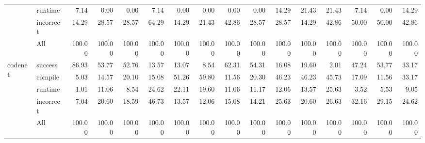 \begin{tabular}{llrrrrrrrrrrrrrr}
 & runtime & 7.14 & 0.00 & 0.00 & 7.14 & 0.00 & 0.00 & 0.00 & 0.00 & 14.29 & 21.43 & 21.43 & 7.14 & 0.00 & 14.29 \\
 & incorrect & 14.29 & 28.57 & 28.57 & 64.29 & 14.29 & 21.43 & 42.86 & 28.57 & 28.57 & 14.29 & 42.86 & 50.00 & 50.00 & 42.86 \\
 & All & 100.00 & 100.00 & 100.00 & 100.00 & 100.00 & 100.00 & 100.00 & 100.00 & 100.00 & 100.00 & 100.00 & 100.00 & 100.00 & 100.00 \\
\cline{1-16}
\multirow[t]{5}{*}{codenet} & success & 86.93 & 53.77 & 52.76 & 13.57 & 13.07 & 8.54 & 62.31 & 54.31 & 16.08 & 19.60 & 2.01 & 47.24 & 53.77 & 33.17 \\
 & compile & 5.03 & 14.57 & 20.10 & 15.08 & 51.26 & 59.80 & 11.56 & 20.30 & 46.23 & 46.23 & 45.73 & 17.09 & 11.56 & 33.17 \\
 & runtime & 1.01 & 11.06 & 8.54 & 24.62 & 22.11 & 19.60 & 11.06 & 11.17 & 12.06 & 13.57 & 25.63 & 3.52 & 5.53 & 9.05 \\
 & incorrect & 7.04 & 20.60 & 18.59 & 46.73 & 13.57 & 12.06 & 15.08 & 14.21 & 25.63 & 20.60 & 26.63 & 32.16 & 29.15 & 24.62 \\
 & All & 100.00 & 100.00 & 100.00 & 100.00 & 100.00 & 100.00 & 100.00 & 100.00 & 100.00 & 100.00 & 100.00 & 100.00 & 100.00 & 100.00 \\
\cline{1-16}
\bottomrule
\end{tabular}

